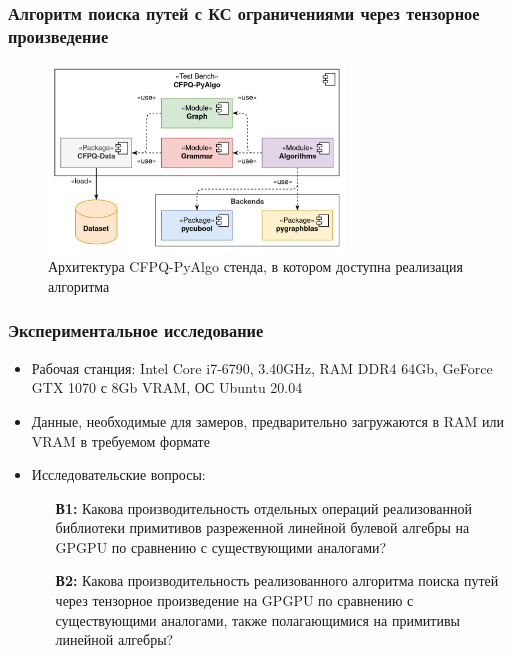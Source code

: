 \documentclass[aspectratio=169,xcolor=table,english]{beamer}
\begin{document}
\begin{frame}[fragile] \frametitle{Алгоритм поиска путей с КС ограничениями через тензорное произведение}
    \begin{center}
     \begin{minipage}[m]{0.8\linewidth}
        \begin{figure}
            \centering
            \includegraphics[width=0.7\textwidth]{figures/cfpq_py_algo.png}
            \caption{Архитектура CFPQ-PyAlgo стенда, в котором доступна реализация алгоритма}
        \end{figure}
    \end{minipage}\hfill   
    \end{center}
\end{frame}

\begin{frame}[fragile] \frametitle{Экспериментальное исследование}
    \begin{itemize}
        \item Рабочая станция: Intel Core i7-6790, 3.40GHz, RAM DDR4 64Gb, GeForce GTX 1070 с 8Gb VRAM, ОС Ubuntu 20.04
        \item Данные, необходимые для замеров, предварительно загружаются в RAM или VRAM в требуемом формате
        \item Исследовательские вопросы:
        {
        \begin{itemize}
            \item[\textbf{В1:}] Какова производительность отдельных операций реализованной библиотеки примитивов разреженной линейной булевой алгебры на GPGPU по сравнению с существующими аналогами?
   
           \item[\textbf{В2:}] Какова производительность реализованного алгоритма поиска путей через тензорное произведение на GPGPU  по сравнению с существующими аналогами, также полагающимися на примитивы линейной алгебры?  
        \end{itemize}
        }
    \end{itemize}
\end{frame}
\end{document}
